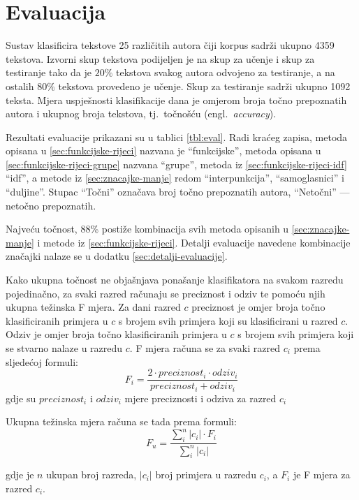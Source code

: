 \documentclass{article}
\newcommand{\engl}[1]{(engl.~\emph{#1})}
\begin{document}
\section{Evaluacija}
\label{sec:evaluacija}
Sustav klasificira tekstove 25 različitih autora čiji korpus sadrži ukupno 4359
tekstova. Izvorni skup tekstova podijeljen je na skup za učenje i skup za testiranje
tako da je $20\%$ tekstova svakog autora odvojeno za testiranje, a na
ostalih $80\%$ tekstova provedeno je učenje. Skup za testiranje sadrži
ukupno 1092 teksta. Mjera uspješnosti klasifikacije dana je omjerom broja točno
prepoznatih autora i ukupnog broja tekstova, tj.~točnošću \engl{accuracy}.

Rezultati evaluacije prikazani su u tablici \ref{tbl:eval}. Radi kraćeg zapisa,
metoda opisana u \ref{sec:funkcijske-rijeci} nazvana je ``funkcijske'', metoda
opisana u \ref{sec:funkcijske-rijeci-grupe} nazvana ``grupe'',
metoda iz \ref{sec:funkcijske-rijeci-idf} ``idf'', a metode iz
\ref{sec:znacajke-manje} redom ``interpunkcija'', ``samoglasnici'' i
``duljine''. Stupac ``Točni'' označava broj točno prepoznatih autora,
``Netočni'' --- netočno prepoznatih.

Najveću točnost, 88\% postiže kombinacija svih metoda opisanih u
\ref{sec:znacajke-manje} i metode iz \ref{sec:funkcijske-rijeci}. Detalji
evaluacije navedene kombinacije značajki nalaze se u dodatku
\ref{sec:detalji-evaluacije}.

Kako ukupna točnost ne objašnjava ponašanje klasifikatora na svakom razredu
pojedinačno, za svaki razred računaju se preciznost i odziv te pomoću njih
ukupna težinska F mjera. Za dani razred $c$ preciznost je omjer broja točno
klasificiranih primjera u $c$ s brojem svih primjera koji su klasificirani u
razred $c$. Odziv je omjer broja točno klasificiranih primjera u $c$ s brojem
svih primjera koji se stvarno nalaze u razredu $c$. F mjera računa se za svaki
razred $c_i$ prema sljedećoj formuli:
\begin{equation}
F_i = \frac{2 \cdot preciznost_i \cdot odziv_i}{preciznost_i + odziv_i}
\end{equation}
gdje su $preciznost_i$ i $odziv_i$ mjere preciznosti i odziva za razred $c_i$

Ukupna težinska mjera računa se tada prema formuli:
\begin{equation}
F_u = \frac{\sum^{n}_i |c_i|\cdot F_i}{\sum^n_i|c_i|}
\end{equation}

gdje je $n$ ukupan broj razreda, $|c_i|$ broj primjera u razredu $c_i$, a $F_i$
je F mjera za razred $c_i$.
\end{document}
